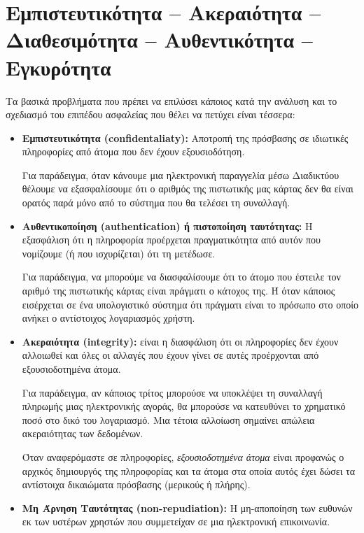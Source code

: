 %
%
\section{Εμπιστευτικότητα -- Ακεραιότητα -- Διαθεσιμότητα -- Αυθεντικότητα -- Εγκυρότητα}

Τα βασικά προβλήματα που πρέπει να επιλύσει κάποιος κατά την ανάλυση και το σχεδιασμό του επιπέδου ασφαλείας που θέλει να πετύχει είναι τέσσερα:

\begin{itemize}

\item \textbf{Εμπιστευτικότητα (confidentaliaty):} Αποτροπή της πρόσβασης σε ιδιωτικές πληροφορίες από άτομα που δεν έχουν εξουσιοδότηση.

Για παράδειγμα, όταν κάνουμε μια ηλεκτρονική παραγγελία μέσω Διαδικτύου θέλουμε να εξασφαλίσουμε ότι ο αριθμός της πιστωτικής μας κάρτας δεν θα είναι ορατός παρά μόνο από το σύστημα  που θα τελέσει τη συναλλαγή. 

\item \textbf{Αυθεντικοποίηση (authentication) ή πιστοποίηση ταυτότητας:} Η εξασφάλιση ότι η πληροφορία προέρχεται πραγματικότητα από αυτόν που νομίζουμε (ή που ισχυρίζεται) ότι τη μετέδωσε.

Για παράδειγμα, να μπορούμε να διασφαλίσουμε ότι το άτομο που έστειλε τον αριθμό της πιστωτικής κάρτας είναι πράγματι ο κάτοχος της.  Ή όταν κάποιος εισέρχεται σε ένα υπολογιστικό σύστημα ότι πράγματι είναι το πρόσωπο στο οποίο ανήκει ο αντίστοιχος λογαριασμός χρήστη.

\item \textbf{Ακεραιότητα (integrity):} είναι η διασφάλιση ότι οι πληροφορίες δεν έχουν αλλοιωθεί και όλες οι αλλαγές που έχουν γίνει σε αυτές προέρχονται από εξουσιοδοτημένα άτομα.

Για παράδειγμα, αν κάποιος τρίτος μπορούσε να υποκλέψει τη συναλλαγή πληρωμής μιας ηλεκτρονικής αγοράς, θα μπορούσε να κατευθύνει το χρηματικό ποσό στο δικό του λογαριασμό. Μια τέτοια αλλοίωση σημαίνει απώλεια ακεραιότητας των δεδομένων.

Όταν αναφερόμαστε σε πληροφορίες, \emph{εξουσιοδοτημένα άτομα} είναι προφανώς ο αρχικός δημιουργός της πληροφορίας και τα άτομα στα οποία αυτός έχει δώσει τα αντίστοιχα δικαιώματα πρόσβασης (μερικούς ή πλήρης). 

\item \textbf{Μη Άρνηση Ταυτότητας (non-repudiation):} Η μη-αποποίηση των ευθυνών εκ των υστέρων χρηστών που συμμετείχαν σε μια ηλεκτρονική επικοινωνία.


\end{itemize}
